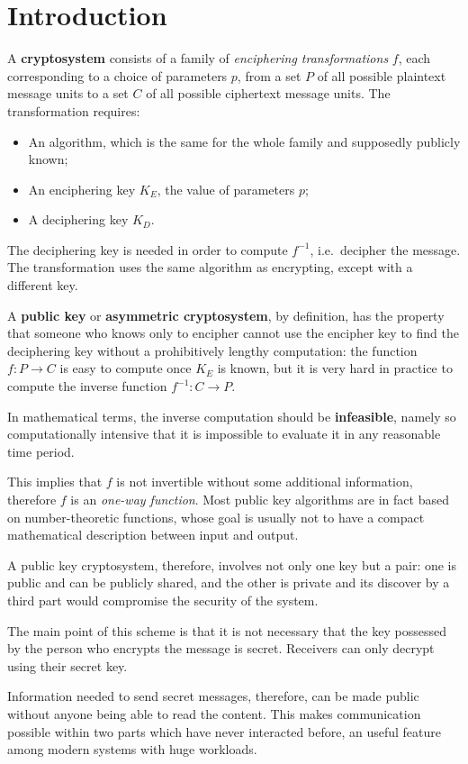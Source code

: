 \section{Introduction}
A \textbf{cryptosystem} consists of a family of \textit{enciphering transformations} $f$, each corresponding to a choice of parameters $p$, from a set $P$ of all possible plaintext message units to a set $C$ of all possible ciphertext message units. The transformation requires:
\begin{itemize}
	\item An algorithm, which is the same for the whole family and supposedly publicly known;
	\item An enciphering key $K_E$, the value of parameters $p$;
	\item A deciphering key $K_D$.
\end{itemize}
The deciphering key is needed in order to compute $f^{-1}$, i.e.\ decipher the message. The transformation uses the same algorithm as encrypting, except with a different key. 

A \textbf{public key} or \textbf{asymmetric cryptosystem}, by definition, has the property that someone who knows only to encipher cannot use the encipher key to find the deciphering key without a prohibitively lengthy computation: the function $f : P \rightarrow C$ is easy to compute once $K_E$ is known, but it is very hard in practice to compute the inverse function $f^{-1} : C \rightarrow P$.

In mathematical terms, the inverse computation should be \textbf{infeasible}, namely so computationally intensive that it is impossible to evaluate it in any reasonable time period. 

This implies that $f$ is not invertible without some additional information, therefore $f$ is an \textit{one-way function}. Most public key algorithms are in fact based on number-theoretic functions, whose goal is usually not to have a compact mathematical description between input and output.

A public key cryptosystem, therefore, involves not only one key but a pair: one is public and can be publicly shared, and the other is private and its discover by a third part would compromise the security of the system.

The main point of this scheme is that it is not necessary that the key possessed by the person who encrypts the message is secret. Receivers can only decrypt using their secret key.

Information needed to send secret messages, therefore, can be made public without anyone being able to read the content. This makes communication possible within two parts which have never interacted before, an useful feature among modern systems with huge workloads. 


